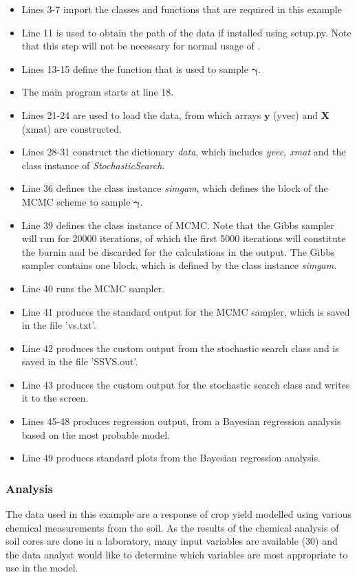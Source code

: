 \documentclass[article]{jss}
\begin{document}
\begin{itemize}
\item Lines 3-7 import the classes and functions that are required in this
example
\item Line 11 is used to obtain the path of the data if installed using
setup.py. Note that this step will not be necessary for normal usage
of .
\item Lines 13-15 define the function that is used to sample $\bm{\gamma}.$
\item The main program starts at line 18.
\item Lines 21-24 are used to load the data, from which arrays $\bm{y}$
(yvec) and $\bm{X}$ (xmat) are constructed.
\item Lines 28-31 construct the dictionary \emph{data}, which includes \emph{yvec,
xmat} and the class instance of \emph{StochasticSearch}.
\item Line 36 defines the class instance \emph{simgam}, which defines the
block of the MCMC scheme to sample $\bm{\gamma}$.
\item Line 39 defines the class instance of MCMC. Note that the Gibbs sampler
will run for 20000 iterations, of which the first 5000 iterations
will constitute the burnin and be discarded for the calculations in
the output. The Gibbs sampler contains one block, which is defined
by the class instance \emph{simgam}.
\item Line 40 runs the MCMC sampler.
\item Line 41 produces the standard output for the MCMC sampler, which is
saved in the file 'vs.txt'.
\item Line 42 produces the custom output from the stochastic search class
and is saved in the file 'SSVS.out'.
\item Line 43 produces the custom output for the stochastic search class
and writes it to the screen.
\item Lines 45-48 produces regression output, from a Bayesian regression
analysis based on the most probable model.
\item Line 49 produces standard plots from the Bayesian regression analysis.
\end{itemize}

\subsubsection{Analysis}

The data used in this example are a response of crop yield modelled
using various chemical measurements from the soil. As the results of
the chemical analysis of soil cores are done in a laboratory, many
input variables are available (30) and the data analyst would like to
determine which variables are most appropriate to use in the model.
\end{document}
